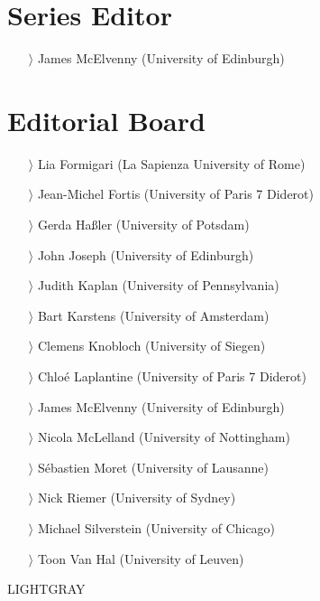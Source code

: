 \documentclass[
notumble,
nofoldmark,
]{leaflet}
\begin{document}
 
 {
\small 
    \color{LIGHTGRAY}
    \section{Series Editor}    

    \begin{itemize}
    \item[$\rangle$] James McElvenny (University of Edinburgh)
    \end{itemize}
    \section{Editorial Board} 
    
    \begin{itemize}
    \item[$\rangle$]  Lia Formigari (La Sapienza University of Rome)
    \item[$\rangle$]  Jean-Michel Fortis (University of Paris 7 Diderot)
    \item[$\rangle$]  Gerda Haßler (University of Potsdam)
    \item[$\rangle$]  John Joseph (University of Edinburgh)
    \item[$\rangle$]  Judith Kaplan (University of Pennsylvania)
    \item[$\rangle$]  Bart Karstens (University of Amsterdam)
    \item[$\rangle$]  Clemens Knobloch (University of Siegen)
    \item[$\rangle$]  Chloé Laplantine (University of Paris 7 Diderot)
    \item[$\rangle$]  James McElvenny (University of Edinburgh)
    \item[$\rangle$]  Nicola McLelland (University of Nottingham)
    \item[$\rangle$]  Sébastien Moret (University of Lausanne)
    \item[$\rangle$]  Nick Riemer (University of Sydney)
    \item[$\rangle$]  Michael Silverstein (University of Chicago)
    \item[$\rangle$]  Toon Van Hal (University of Leuven) 
    \end{itemize}
    
}{LIGHTGRAY}
\end{document}
